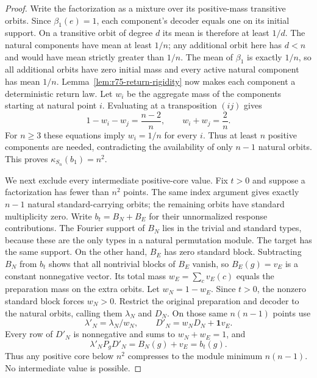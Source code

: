\begin{proof}
Write the factorization as a mixture over its positive-mass
transitive orbits. Since $\beta_1(e)=1$, each component's
decoder equals one on its initial support. On a transitive orbit
of degree $d$ its mean is therefore at least $1/d$.
The natural components have mean at least $1/n$; any additional
orbit here has $d<n$ and would have mean strictly greater than
$1/n$. The mean of $\beta_1$ is exactly $1/n$, so all additional
orbits have zero initial mass and every active natural component
has mean $1/n$. Lemma~\ref{lem:r75-return-rigidity} now makes
each component a deterministic return law. Let $w_i$ be the
aggregate mass of the components starting at natural point $i$.
Evaluating at a transposition $(ij)$ gives
\[
 1-w_i-w_j=\frac{n-2}{n},
 \qquad w_i+w_j=\frac2n.
\]
For $n\ge3$ these equations imply $w_i=1/n$ for every $i$.
Thus at least $n$ positive components are needed, contradicting
the availability of only $n-1$ natural orbits. This proves
$\kappa_{S_n}(b_1)=n^2$.

We next exclude every intermediate positive-core value. Fix $t>0$
and suppose a factorization has fewer than $n^2$ points. The same
index argument gives exactly $n-1$ natural standard-carrying orbits;
the remaining orbits have standard multiplicity zero. Write
$b_t=B_N+B_E$ for their unnormalized response contributions. The
Fourier support of $B_N$ lies in the trivial and standard types,
because these are the only types in a natural permutation module.
The target has the same support. On the other hand, $B_E$ has zero
standard block. Subtracting $B_N$ from $b_t$ shows that all nontrivial
blocks of $B_E$ vanish, so $B_E(g)=v_E$ is a constant nonnegative
vector. Its total mass $w_E=\sum_c v_E(c)$ equals the preparation mass
on the extra orbits. Let $w_N=1-w_E$. Since $t>0$, the nonzero standard
block forces $w_N>0$. Restrict the original preparation and decoder to
the natural orbits, calling them $\lambda_N$ and $D_N$. On those same
$n(n-1)$ points use
\[
 \lambda'_N=\lambda_N/w_N,\qquad
 D'_N=w_ND_N+\mathbf1 v_E.
\]
Every row of $D'_N$ is nonnegative and sums to $w_N+w_E=1$, and
\[
 \lambda'_N P_gD'_N=B_N(g)+v_E=b_t(g).
\]
Thus any positive core below $n^2$ compresses to the module minimum
$n(n-1)$. No intermediate value is possible.


\end{proof}
